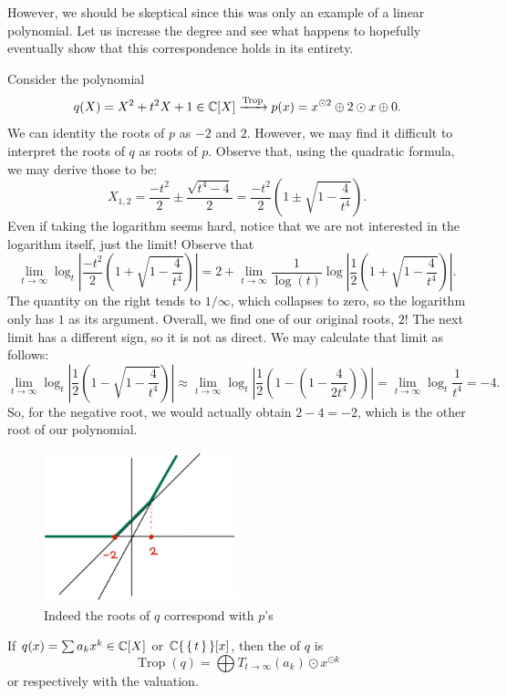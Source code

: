 \documentclass[12pt]{memoir}
\DeclareMathOperator{\Trop}{Trop}
\theoremstyle{definition}
\begin{document}
However, we should be skeptical since this was only an example of a linear polynomial. Let us increase the degree and see what happens to hopefully eventually show that this correspondence holds in its entirety.

\begin{Ex}
    Consider the polynomial
    $$q(X)=X^2+t^2X+1\in\bC[X]\xrightarrow[]{\Trop}p(x)=x^{\odot2}\oplus 2\odot x\oplus 0.$$
    We can identity the roots of $p$ as $-2$ and $2$. However, we may find it difficult to interpret the roots of $q$ as roots of $p$. Observe that, using the quadratic formula, we may derive those to be:
    $$X_{1,2}=\frac{-t^2}{2}\pm\frac{\sqrt{t^4-4}}{2}=\frac{-t^2}{2}\left(1\pm\sqrt{1-\frac{4}{t^4}}\right).$$
    Even if taking the logarithm seems hard, notice that we are not interested in the logarithm itself, just the limit! Observe that 
    $$\lim_{t\to\infty}\log_t\left|\frac{-t^2}{2}\left(1+\sqrt{1-\frac{4}{t^4}}\right)\right|=2+\lim_{t\to\infty}\frac{1}{\log(t)}\log\left|\frac{1}{2}\left(1+\sqrt{1-\frac{4}{t^4}}\right)\right|.$$
    The quantity on the right tends to $1/\infty$, which collapses to zero, so the logarithm only has $1$ as its argument. Overall, we find one of our original roots, $2$! The next limit has a different sign, so it is not as direct. We may calculate that limit as follows:
    $$\lim_{t\to\infty}\log_t\left|\frac{1}{2}\left(1-\sqrt{1-\frac{4}{t^4}}\right)\right|\approx\lim_{t\to\infty}\log_t\left|\frac{1}{2}\left(1-\left(1-\frac{4}{2t^4}\right)\right)\right|=\lim_{t\to\infty}\log_t\frac{1}{t^4}=-4.$$
    So, for the negative root, we would actually obtain $2-4=-2$, which is the other root of our polynomial.
    \begin{figure}[h!]
        \centering
        \includegraphics[width=0.5\textwidth]{figs/fig4-5CorrespondenceRoots2Example.png}
        \caption{Indeed the roots of $q$ correspond with $p$'s}
        \label{fig:4.5-CorrespondenceRoots2Example}
    \end{figure}
\end{Ex}
\begin{Def}
    If $q(x)=\sum a_kx^k\in\mathbb{C}[X]$ or $\mathbb{C}\{\,\{\,t\,\}\,\}[x]$, then the  of $q$ is 
    $$\Trop(q)=\bigoplus T_{t\to\infty}(a_k)\odot x^{\odot k}$$
    or respectively with the valuation. 
\end{Def}
\end{document}
